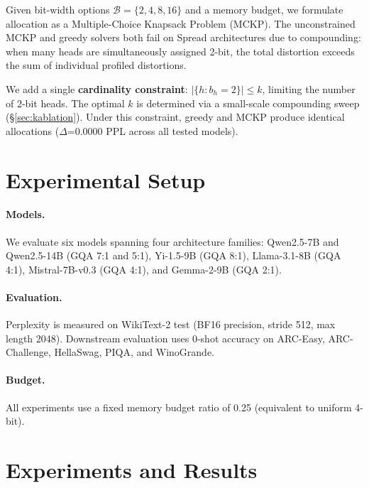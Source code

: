 \documentclass[11pt,a4paper]{article}
\begin{document}
Given bit-width options $\mathcal{B} = \{2, 4, 8, 16\}$ and a memory budget, we formulate allocation as a Multiple-Choice Knapsack Problem (MCKP).
The unconstrained MCKP and greedy solvers both fail on Spread architectures due to compounding: when many heads are simultaneously assigned 2-bit, the total distortion exceeds the sum of individual profiled distortions.

We add a single \textbf{cardinality constraint}: $|\{h : b_h = 2\}| \leq k$, limiting the number of 2-bit heads.
The optimal $k$ is determined via a small-scale compounding sweep (\S\ref{sec:kablation}).
Under this constraint, greedy and MCKP produce identical allocations ($\Delta$=0.0000 PPL across all tested models).

\section{Experimental Setup}

\paragraph{Models.}
We evaluate six models spanning four architecture families: Qwen2.5-7B and Qwen2.5-14B (GQA 7:1 and 5:1), Yi-1.5-9B (GQA 8:1), Llama-3.1-8B (GQA 4:1), Mistral-7B-v0.3 (GQA 4:1), and Gemma-2-9B (GQA 2:1).

\paragraph{Evaluation.}
Perplexity is measured on WikiText-2 test (BF16 precision, stride 512, max length 2048).
Downstream evaluation uses 0-shot accuracy on ARC-Easy, ARC-Challenge, HellaSwag, PIQA, and WinoGrande.

\paragraph{Budget.}
All experiments use a fixed memory budget ratio of 0.25 (equivalent to uniform 4-bit).

\section{Experiments and Results}
\end{document}
